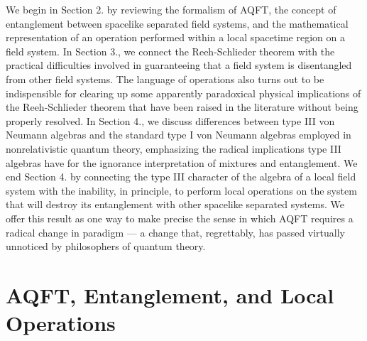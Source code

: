\documentclass[12pt]{article}
\begin{document}
We begin in Section 2. by reviewing the formalism of 
AQFT, the concept of entanglement between spacelike separated field 
systems, and the mathematical representation of an operation 
performed within a local spacetime region on a field system.  In Section 
3., 
we connect the Reeh-Schlieder theorem with the practical difficulties 
involved in guaranteeing that a field system is disentangled from 
other field systems.  The language of operations also 
turns out to be indispensible for clearing up some apparently 
paradoxical physical implications of 
the Reeh-Schlieder theorem that have been raised in the literature 
without being properly resolved.  
In Section 4., we discuss differences
between type III von Neumann algebras and the standard type I von 
Neumann algebras employed in nonrelativistic quantum theory, 
emphasizing the radical implications type III algebras 
have for the ignorance interpretation 
of mixtures and entanglement.  We end Section 4. by 
connecting the type III character of the 
algebra of a local field system with the inability, in principle, to 
perform local operations on the system that will destroy its entanglement 
with other spacelike separated systems.  We offer this result as one 
way to make precise the sense in which AQFT requires a radical change 
in paradigm --- a change that, regrettably, has passed virtually
unnoticed by philosophers of quantum theory. 

\section{AQFT, Entanglement, and Local Operations}
\end{document}
